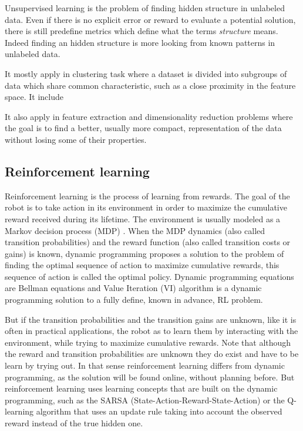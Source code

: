 Unsupervised learning is the problem of finding hidden structure in unlabeled data. Even if there is no explicit error or reward to evaluate a potential solution, there is still predefine metrics which define what the terms \emph{structure} means. Indeed finding an hidden structure is more looking from known patterns in unlabeled data.

It mostly apply in clustering task where a dataset is divided into subgroups of data which share common characteristic, such as a close proximity in the feature space. It include

It also apply in feature extraction and dimensionality reduction problems where the goal is to find a better, usually more compact, representation of the data without losing some of their properties.

\subsection{Reinforcement learning}

Reinforcement learning is the process of learning from rewards. The goal of the robot is to take action in its environment in order to maximize the cumulative reward received during its lifetime. The environment is usually modeled as a Markov decision process (MDP) \cite{sutton1998reinforcement}. When the MDP dynamics (also called transition probabilities) and the reward function (also called transition costs or gains) is known, dynamic programming proposes a solution to the problem of finding the optimal sequence of action to maximize cumulative rewards, this sequence of action is called the optimal policy. Dynamic programming equations are Bellman equations \cite{bellman1956dynamic} and Value Iteration (VI) algorithm \cite{sutton1998reinforcement} is a dynamic programming solution to a fully define, known in advance, RL problem.

But if the transition probabilities and the transition gains are unknown, like it is often in practical applications, the robot as to learn them by interacting with the environment, while trying to maximize cumulative rewards. Note that although the reward and transition probabilities are unknown they do exist and have to be learn by trying out. In that sense reinforcement learning differs from dynamic programming, as the solution will be found online, without planning before. But reinforcement learning uses learning concepts that are built on the dynamic programming, such as the SARSA (State-Action-Reward-State-Action) or the Q-learning algorithm \cite{rummery1994line,sutton1998reinforcement} that uses an update rule taking into account the observed reward instead of the true hidden one.

